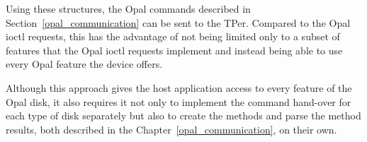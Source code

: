 




Using these structures, the Opal commands described in Section~\ref{opal_communication} can be sent to the TPer. Compared to the Opal ioctl requests, this has the advantage of not being limited only to a subset of features that the Opal ioctl requests implement and instead being able to use every Opal feature the device offers. %

Although this approach gives the host application access to every feature of the Opal disk, it also requires it not only to implement the command hand-over for each type of disk separately but also to create the methods and parse the method results, both described in the Chapter~\ref{opal_communication}, on their own.




 
